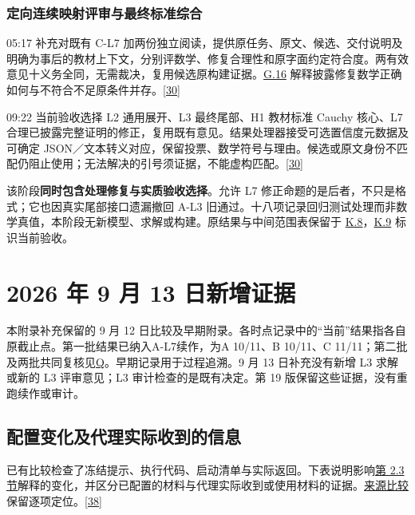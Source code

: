 \subsubsection[定向连续映射评审与最终标准综合]{\texorpdfstring{\protect\hypertarget{n6-4}{}定向连续映射评审与最终标准综合}{定向连续映射评审与最终标准综合}}
05:17 补充对既有 C-L7 加两份独立阅读，提供原任务、原文、候选、交付说明及明确为事后的教材上下文，分别评数学、修复合理性和原字面约定符合度。两有效意见十义务全同，无需裁决，复用候选原构建证据。\hyperlink{g16}{G.16} 解释披露修复数学正确如何与不符合不足原条件并存。\href{zh.pdf\#ref-30}{\mbox{[30]}}

09:22 当前验收选择 L2 通用展开、L3 最终尾部、H1 教材标准 Cauchy 核心、L7 合理已披露完整证明的修正，复用既有意见。结果处理器接受可选置信度元数据及可确定 JSON／文本转义对应，保留投票、数学符号与理由。候选或原文身份不匹配仍阻止使用；无法解决的引号须证据，不能虚构匹配。\href{zh.pdf\#ref-30}{\mbox{[30]}}

该阶段\textbf{同时包含处理修复与实质验收选择}。允许 L7 修正命题的是后者，不只是格式；它也因真实尾部接口遗漏撤回 A-L3 旧通过。十八项记录回归测试处理而非数学真值，本阶段无新模型、求解或构建。原结果与中间范围表保留于 \hyperlink{k8}{K.8}，\hyperlink{k9}{K.9} 标识当前验收。

\section[2026 年 9 月 13 日新增证据]{\texorpdfstring{\protect\hypertarget{appendix-o}{}2026 年 9 月 13 日新增证据}{2026 年 9 月 13 日新增证据}}
本附录补充保留的 9 月 12 日比较及早期附录。各时点记录中的“当前”结果指各自原截止点。第一批结果已纳入A-L7续作，为A 10/11、B 10/11、C 11/11；第二批及两批共同复核见\hyperlink{appendix-q}{Q}。早期记录用于过程追溯。9 月 13 日补充没有新增 L3 求解或新的 L3 评审意见；L3 审计检查的是既有决定。第 19 版保留这些证据，没有重跑续作或审计。

\subsection[配置变化及代理实际收到的信息]{\texorpdfstring{\protect\hypertarget{o1}{}配置变化及代理实际收到的信息}{配置变化及代理实际收到的信息}}
已有比较检查了冻结提示、执行代码、启动清单与实际返回。下表说明影响\href{zh.pdf\#section-2-3}{第 2.3 节}解释的变化，并区分已配置的材料与代理实际收到或使用材料的证据。\href{verification/revision13/abc_version_audit.md}{来源比较}保留逐项定位。\href{zh.pdf\#ref-38}{\mbox{[38]}}

